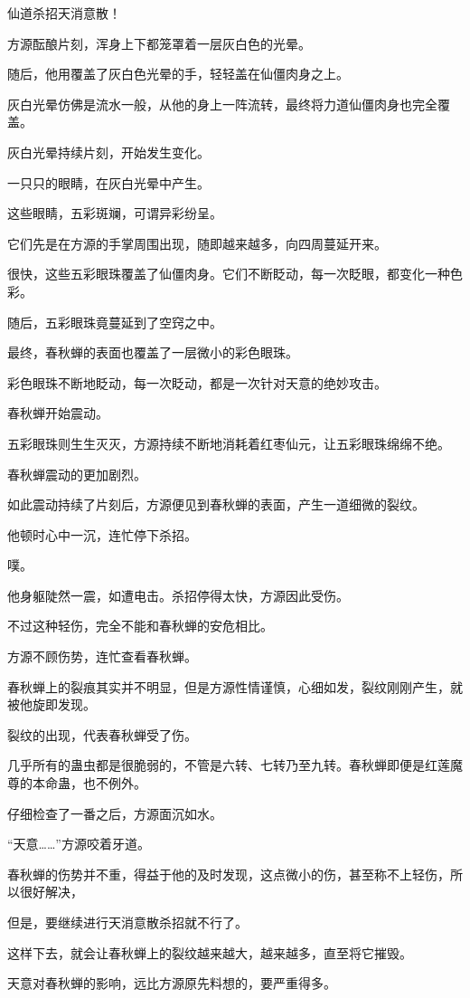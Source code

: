 \begin{this_body}
仙道杀招天消意散！

方源酝酿片刻，浑身上下都笼罩着一层灰白色的光晕。

随后，他用覆盖了灰白色光晕的手，轻轻盖在仙僵肉身之上。

灰白光晕仿佛是流水一般，从他的身上一阵流转，最终将力道仙僵肉身也完全覆盖。

灰白光晕持续片刻，开始发生变化。

一只只的眼睛，在灰白光晕中产生。

这些眼睛，五彩斑斓，可谓异彩纷呈。

它们先是在方源的手掌周围出现，随即越来越多，向四周蔓延开来。

很快，这些五彩眼珠覆盖了仙僵肉身。它们不断眨动，每一次眨眼，都变化一种色彩。

随后，五彩眼珠竟蔓延到了空窍之中。

最终，春秋蝉的表面也覆盖了一层微小的彩色眼珠。

彩色眼珠不断地眨动，每一次眨动，都是一次针对天意的绝妙攻击。

春秋蝉开始震动。

五彩眼珠则生生灭灭，方源持续不断地消耗着红枣仙元，让五彩眼珠绵绵不绝。

春秋蝉震动的更加剧烈。

如此震动持续了片刻后，方源便见到春秋蝉的表面，产生一道细微的裂纹。

他顿时心中一沉，连忙停下杀招。

噗。

他身躯陡然一震，如遭电击。杀招停得太快，方源因此受伤。

不过这种轻伤，完全不能和春秋蝉的安危相比。

方源不顾伤势，连忙查看春秋蝉。

春秋蝉上的裂痕其实并不明显，但是方源性情谨慎，心细如发，裂纹刚刚产生，就被他旋即发现。

裂纹的出现，代表春秋蝉受了伤。

几乎所有的蛊虫都是很脆弱的，不管是六转、七转乃至九转。春秋蝉即便是红莲魔尊的本命蛊，也不例外。

仔细检查了一番之后，方源面沉如水。

“天意……”方源咬着牙道。

春秋蝉的伤势并不重，得益于他的及时发现，这点微小的伤，甚至称不上轻伤，所以很好解决，

但是，要继续进行天消意散杀招就不行了。

这样下去，就会让春秋蝉上的裂纹越来越大，越来越多，直至将它摧毁。

天意对春秋蝉的影响，远比方源原先料想的，要严重得多。


\end{this_body}
